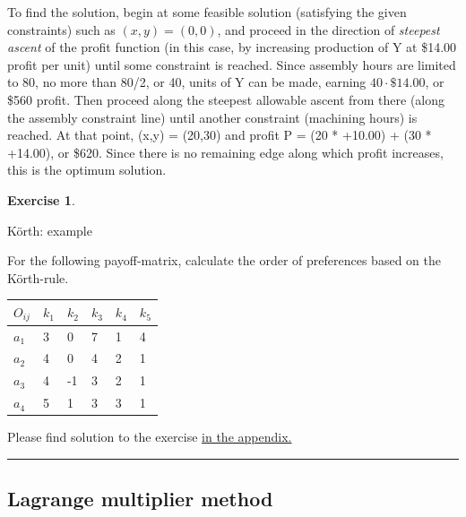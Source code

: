 \documentclass[
  12pt,
  oneside]{book}
\theoremstyle{definition}
\theoremstyle{definition}
\theoremstyle{definition}
\newtheorem{exercise}{Exercise}[chapter]
\theoremstyle{definition}
\theoremstyle{remark}
\begin{document}
To find the solution, begin at some feasible solution (satisfying the given constraints) such as \((x,y) = (0,0)\), and proceed in the direction of \emph{steepest ascent} of the profit function (in this case, by increasing production of Y at \$14.00 profit per unit) until some constraint is reached. Since assembly hours are limited to 80, no more than 80/2, or 40, units of Y can be made, earning \(40 \cdot \$14.00\), or \$560 profit. Then proceed along the steepest allowable ascent from there (along the assembly constraint line) until another constraint (machining hours) is reached. At that point, (x,y) = (20,30) and profit P = (20 * +10.00) + (30 * +14.00), or \$620. Since there is no remaining edge along which profit increases, this is the optimum solution.

\begin{exercise}
\protect\hypertarget{exr:koerth-example}{}\label{exr:koerth-example}

Körth: example

For the following payoff-matrix, calculate the order of preferences based on the Körth-rule.

\begin{longtable}[]{@{}llllll@{}}
\toprule\noalign{}
\(O_{ij}\) & \(k_1\) & \(k_2\) & \(k_3\) & \(k_4\) & \(k_5\) \\
\midrule\noalign{}
\endhead
\bottomrule\noalign{}
\endlastfoot
\(a_1\) & 3 & 0 & 7 & 1 & 4 \\
\(a_2\) & 4 & 0 & 4 & 2 & 1 \\
\(a_3\) & 4 & -1 & 3 & 2 & 1 \\
\(a_4\) & 5 & 1 & 3 & 3 & 1 \\
\end{longtable}

Please find solution to the exercise \protect\hyperlink{sol:koerth-example}{in the appendix.}

\begin{center}\rule{0.5\linewidth}{0.5pt}\end{center}

\end{exercise}

\hypertarget{lagrange-multiplier-method}{%
\subsection{Lagrange multiplier method}\label{lagrange-multiplier-method}}
\end{document}

